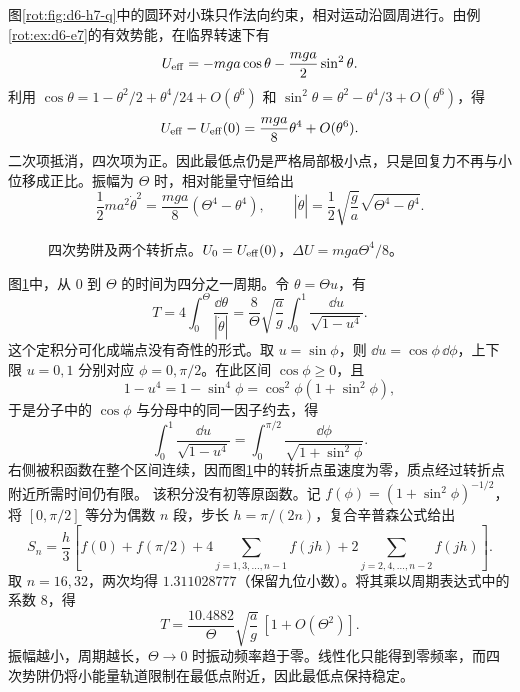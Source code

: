 \begin{solution}
图\ref{rot:fig:d6-h7-q}中的圆环对小珠只作法向约束，相对运动沿圆周进行。由例\ref{rot:ex:d6-e7}的有效势能，在临界转速下有
\[
U_{\rm eff}=-mga\cos\theta-\frac{mga}{2}\sin^2\theta.
\]
利用 $\cos\theta=1-\theta^2/2+\theta^4/24+O(\theta^6)$ 和 $\sin^2\theta=\theta^2-\theta^4/3+O(\theta^6)$，得
\[
U_{\rm eff}-U_{\rm eff}(0)=\frac{mga}{8}\theta^4+O(\theta^6).
\]
二次项抵消，四次项为正。因此最低点仍是严格局部极小点，只是回复力不再与小位移成正比。振幅为 $\Theta$ 时，相对能量守恒给出
\[
\frac12ma^2\dot\theta^2=\frac{mga}{8}(\Theta^4-\theta^4),
\qquad
|\dot\theta|=\frac12\sqrt{\frac ga}\sqrt{\Theta^4-\theta^4}.
\]
\begin{figure}[H]\centering
{}
\caption{四次势阱及两个转折点。$U_0=U_{\rm eff}(0)$，$\Delta U=mga\Theta^4/8$。}\label{rot:fig:d6-h7-s}
\end{figure}
图\ref{rot:fig:d6-h7-s}中，从 $0$ 到 $\Theta$ 的时间为四分之一周期。令 $\theta=\Theta u$，有
\[
T=4\int_0^\Theta\frac{\dd\theta}{|\dot\theta|}
=\frac8\Theta\sqrt{\frac ag}\int_0^1\frac{\dd u}{\sqrt{1-u^4}}.
\]
这个定积分可化成端点没有奇性的形式。取 $u=\sin\phi$，则 $\dd u=\cos\phi\,\dd\phi$，上下限 $u=0,1$ 分别对应 $\phi=0,\pi/2$。在此区间 $\cos\phi\ge0$，且
\[
1-u^4=1-\sin^4\phi=\cos^2\phi(1+\sin^2\phi),
\]
于是分子中的 $\cos\phi$ 与分母中的同一因子约去，得
\[
\int_0^1\frac{\dd u}{\sqrt{1-u^4}}
=\int_0^{\pi/2}\frac{\dd\phi}{\sqrt{1+\sin^2\phi}}.
\]
右侧被积函数在整个区间连续，因而图\ref{rot:fig:d6-h7-s}中的转折点虽速度为零，质点经过转折点附近所需时间仍有限。
该积分没有初等原函数。记 $f(\phi)=(1+\sin^2\phi)^{-1/2}$，将 $[0,\pi/2]$ 等分为偶数 $n$ 段，步长 $h=\pi/(2n)$，复合辛普森公式给出
\[
S_n=\frac h3\left[f(0)+f(\pi/2)
+4\sum_{j=1,3,\ldots,n-1}f(jh)
+2\sum_{j=2,4,\ldots,n-2}f(jh)\right].
\]
取 $n=16,32$，两次均得 $1.311028777$（保留九位小数）。将其乘以周期表达式中的系数 $8$，得
\[
\boxed{T=\frac{10.4882}{\Theta}\sqrt{\frac ag}\,[1+O(\Theta^2)].}
\]
振幅越小，周期越长，$\Theta\to0$ 时振动频率趋于零。线性化只能得到零频率，而四次势阱仍将小能量轨道限制在最低点附近，因此最低点保持稳定。
\end{solution}


